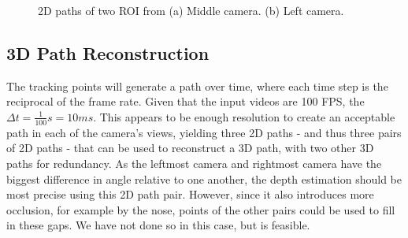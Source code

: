 \documentclass[journal]{IEEEtran}
\begin{document}
\begin{figure}[!t]
	\centering
{}
\hfill
{} 
\caption{2D paths of two ROI from (a) Middle camera. (b) Left camera.}
\label{2PathsML}
\end{figure}

\subsection{3D Path Reconstruction}

The tracking points will generate a path over time, where each time step is the reciprocal of the frame rate. Given that the input videos are 100 FPS, the $\Delta t = \frac{1}{100} s = 10 ms$. This appears to be enough resolution to create an acceptable path in each of the camera's views, yielding three 2D paths - and thus three pairs of 2D paths -  that can be used to reconstruct a 3D path, with two other 3D paths for redundancy. As the leftmost camera and rightmost camera have the biggest difference in angle relative to one another, the depth estimation should be most precise using this 2D path pair. However, since it also introduces more occlusion, for example by the nose, points of the other pairs could be used to fill in these gaps. We have not done so in this case, but is feasible.
\end{document}
